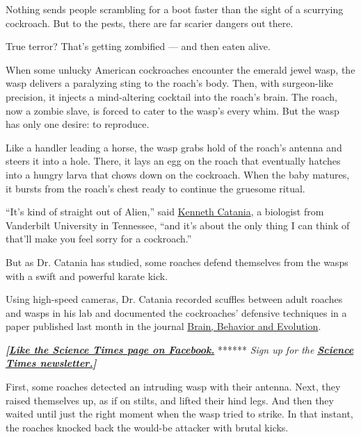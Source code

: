 Nothing sends people scrambling for a boot faster than the sight of a
scurrying cockroach. But to the pests, there are far scarier dangers out
there.

True terror? That's getting zombified --- and then eaten alive.

When some unlucky American cockroaches encounter the emerald jewel wasp,
the wasp delivers a paralyzing sting to the roach's body. Then, with
surgeon-like precision, it injects a mind-altering cocktail into the
roach's brain. The roach, now a zombie slave, is forced to cater to the
wasp's every whim. But the wasp has only one desire: to reproduce.

Like a handler leading a horse, the wasp grabs hold of the roach's
antenna and steers it into a hole. There, it lays an egg on the roach
that eventually hatches into a hungry larva that chows down on the
cockroach. When the baby matures, it bursts from the roach's chest ready
to continue the gruesome ritual.

``It's kind of straight out of Alien,'' said
\href{https://www.google.com/search?q=Kenneth+Catania+a+biologist+from+Vanderbilt+University+in+Tennessee\&rlz=1C5CHFA_enUS779US779\&oq=Kenneth+Catania+a+biologist+from+Vanderbilt+University+in+Tennessee\&aqs=chrome..69i57.333j0j1\&sourceid=chrome\&ie=UTF-8}{Kenneth
Catania}, a biologist from Vanderbilt University in Tennessee, ``and
it's about the only thing I can think of that'll make you feel sorry for
a cockroach.''

But as Dr. Catania has studied, some roaches defend themselves from the
wasps with a swift and powerful karate kick.

Using high-speed cameras, Dr. Catania recorded scuffles between adult
roaches and wasps in his lab and documented the cockroaches' defensive
techniques in a paper published last month in the journal
\href{https://www.karger.com/Article/FullText/490341}{Brain, Behavior
and Evolution}.

\textbf{\emph{{[}}\href{http://on.fb.me/1paTQ1h}{\emph{Like the Science
Times page on Facebook.}}} ****** \emph{\textbar{} Sign up for the}
\textbf{\href{http://nyti.ms/1MbHaRU}{\emph{Science Times
newsletter.}}\emph{{]}}}

First, some roaches detected an intruding wasp with their antenna. Next,
they raised themselves up, as if on stilts, and lifted their hind legs.
And then they waited until just the right moment when the wasp tried to
strike. In that instant, the roaches knocked back the would-be attacker
with brutal kicks.

